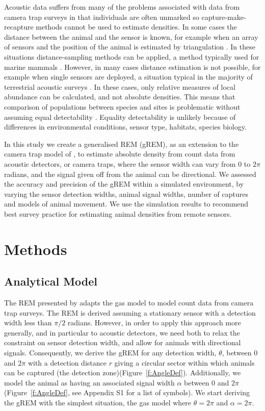\documentclass[a4paper,10pt,reqno,oneside]{amsart}
\begin{document}
Acoustic data suffers from many of the problems associated with data from camera trap surveys in that individuals are often unmarked so capture-make-recapture methods cannot be used to estimate densities. In some cases the distance between the animal and the sensor is known, for example when an array of sensors and the position of the animal is estimated by triangulation \citep{lewis2007sperm}. In these situations distance-sampling methods can be applied, a method typically used for marine mammals \citep{rogers2013density}. However, in many cases distance estimation is not possible, for example when single sensors are deployed, a situation typical in the majority of terrestrial acoustic surveys  \citep{elphick2008you, buckland2008estimating}. In these cases, only relative measures of local abundance can be calculated, and not absolute densities. This means that comparison of populations between species and sites is problematic without assuming equal detectability \citep{schmidt2003count}. %
Equality detectability is unlikely because of differences in environmental conditions, sensor type, habitats, species biology. 

In this study we create a generalised REM (gREM), as an extension to the camera trap model of \citep{rowcliffe2008estimating}, to estimate absolute density from count data from acoustic detectors, or camera traps, where the sensor width can vary from 0 to $2\pi$ radians, and the signal given off from the animal can be directional. We assessed the accuracy and precision of the gREM within a simulated environment, by varying the sensor detection widths, animal signal widths, number of captures and models of animal movement. We use the simulation results to recommend best survey practice for estimating animal densities from remote sensors. 

\section{Methods}

\subsection{Analytical Model}

The REM presented by \citep{rowcliffe2008estimating} adapts the gas model to model count data from camera trap surveys. The REM is derived assuming a stationary sensor with a detection width less than $\pi/2$ radians. However, in order to apply this approach more generally, and in particular to acoustic detectors, we need both to relax the constraint on sensor detection width, and allow for animals with directional signals. Consequently, we derive the gREM for any detection width, $ \theta$, between 0 and $2\pi$ with a detection distance $r$ giving a circular sector within which animals can be captured (the detection zone)(Figure~\ref{f:AngleDef}). Additionally, we model the animal as having an associated signal width $\alpha$ between 0 and $2\pi$(Figure~\ref{f:AngleDef}, see Appendix S1 for a list of symbols). We start deriving the gREM with the simplest situation, the gas model where $\theta =  2\pi$ and $ \alpha =  2\pi$. 
\end{document}
